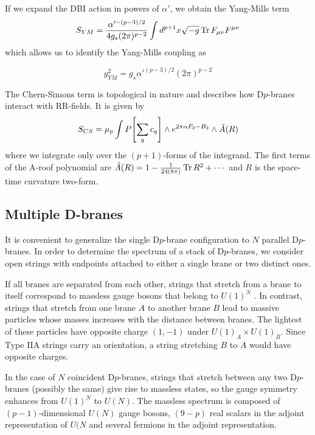 If we expand the DBI action in powers of $\alpha'$, we obtain the Yang-Mills term
\begin{equation}
  S_{YM} = \frac{\alpha'^{-(p-3)/2}}{4g_s (2\pi)^{p-2}} \int d^{p+1} x \sqrt {-g} \Tr F_{\mu\nu} F^{\mu\nu}
\end{equation}
which allows us to identify the Yang-Mills coupling as 

\begin{equation}
g^2_{YM} = g_s \alpha'^{(p-3)/2}(2\pi)^{p-2}
\end{equation}

The Chern-Simons term is topological in nature and describes how D$p$-branes interact with RR-fields.
It is given by
\begin{equation}
S_{CS}= \mu_p \int P\qty[\sum_q c_q]\wedge e^{2\pi\alpha F_2 -B_2}\wedge \hat A (R)
\end{equation}
where we integrate only over the $(p+1)$-forms of the integrand. 
The first terms of the A-roof polynomial are $\hat A(R) = 1- \frac{1}{24(8\pi)} \Tr R^2+\cdots$ and $R$ is the space-time curvature two-form.

\subsection{Multiple D-branes}

It is convenient to generalize the single D$p$-brane configuration to $N$ parallel D$p$-branes.
In order to determine the spectrum of a stack of D$p$-branes, we consider open strings with endpoints 
attached to either a single brane or two distinct ones.

If all branes are separated from each other, strings that stretch from a brane to itself correspond to massless gauge bosons that belong to $U(1)^N$ .
In contrast, strings that stretch from one brane $A$ to another brane $B$ lead to massive particles whose
masses increases with the distance between branes.
The lightest of these particles have opposite charge $(1,-1)$ under $U(1)_A \times U(1)_B$.
Since Type IIA strings carry an orientation, a string stretching $B$ to $A$ would have opposite charges.

In the case of $N$ coincident D$p$-branes, strings that stretch between any two D$p$-branes (possibly the same)
give rise to massless states, so the gauge symmetry enhances from $U(1)^N$ to $U(N)$.
The massless spectrum is composed of $(p-1)$-dimensional $U(N)$ gauge bosons, $(9-p)$ real
scalars in the adjoint representation of $U(N$ and several fermions in the adjoint representation.


